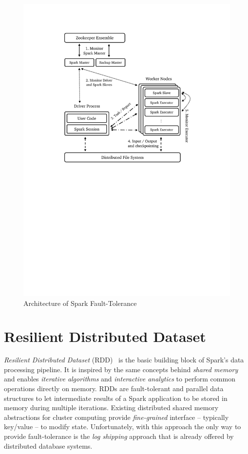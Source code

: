 \begin{description}[leftmargin=0pt]
\begin{figure}[H]
        \includegraphics[clip,trim=4cm 13.6cm 4cm 2.9cm,scale=0.9]{spark-full.pdf}
        \caption[Architecture of Spark Fault-Tolerance]{Architecture of Spark Fault-Tolerance\footnotemark}
        \label{fig:spark-full}
    \end{figure}
\end{description}

\section{Resilient Distributed Dataset}
\label{sp:rdd}
\emph{Resilient Distributed Dataset} (RDD)~\cite{Zaharia:2012} is the basic building block of Spark's data processing pipeline. It is inspired by the same concepts behind \emph{shared memory} and enables \emph{iterative algorithms} and \emph{interactive analytics} to perform common operations directly on memory. RDDs are fault-tolerant and parallel data structures to let intermediate results of a Spark application to be stored in memory during multiple iterations. Existing distributed shared memory abstractions for cluster computing provide \emph{fine-grained} interface -- typically key/value -- to modify state. Unfortunately, with this approach the only way to provide fault-tolerance is the \emph{log shipping} approach that is already offered by distributed database systems.

